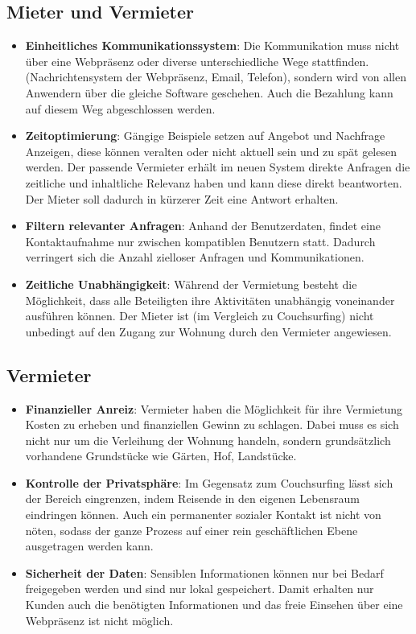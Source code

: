 \subsection{Mieter und Vermieter}
\begin{itemize}
   \item
   \textbf{Einheitliches Kommunikationssystem}: Die Kommunikation muss nicht über eine Webpräsenz oder diverse unterschiedliche Wege stattfinden. (Nachrichtensystem der Webpräsenz, Email, Telefon), sondern wird von allen Anwendern über die gleiche Software geschehen. Auch die Bezahlung kann auf diesem Weg abgeschlossen werden.

   \item 
   \textbf{Zeitoptimierung}: Gängige Beispiele setzen auf Angebot und Nachfrage Anzeigen, diese können veralten oder nicht aktuell sein und zu spät gelesen werden. Der passende Vermieter erhält im neuen System direkte Anfragen die zeitliche und inhaltliche Relevanz haben und kann diese direkt beantworten. Der Mieter soll dadurch in kürzerer Zeit eine Antwort erhalten.

   \item
   \textbf{Filtern relevanter Anfragen}: Anhand der Benutzerdaten, findet eine Kontaktaufnahme nur zwischen kompatiblen Benutzern statt. Dadurch verringert sich die Anzahl zielloser Anfragen und Kommunikationen.

   \item 
   \textbf{Zeitliche Unabhängigkeit}: Während der Vermietung besteht die Möglichkeit, dass alle Beteiligten ihre Aktivitäten unabhängig voneinander ausführen können. Der Mieter ist (im Vergleich zu Couchsurfing) nicht unbedingt auf den Zugang zur Wohnung durch den Vermieter angewiesen. 

\end{itemize}


\subsection{Vermieter}
\begin{itemize}
   \item 
   \textbf{Finanzieller Anreiz}: Vermieter haben die Möglichkeit für ihre Vermietung Kosten zu erheben und finanziellen Gewinn zu schlagen.
   Dabei muss es sich nicht nur um die Verleihung der Wohnung handeln, sondern grundsätzlich vorhandene Grundstücke wie Gärten, Hof, Landstücke.

   \item 
   \textbf{Kontrolle der Privatsphäre}: Im Gegensatz zum Couchsurfing lässt sich der Bereich eingrenzen, indem Reisende in den eigenen Lebensraum eindringen können. Auch ein permanenter sozialer Kontakt ist nicht von nöten, sodass der ganze Prozess auf einer rein geschäftlichen Ebene ausgetragen werden kann.

   \item 
   \textbf{Sicherheit der Daten}: Sensiblen Informationen können nur bei Bedarf freigegeben werden und sind nur lokal gespeichert. Damit erhalten nur Kunden auch die benötigten Informationen und das freie Einsehen über eine Webpräsenz ist nicht möglich.

\end{itemize}
   

